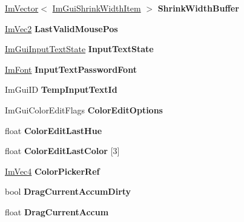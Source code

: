 \begin{DoxyCompactItemize}
\hyperlink{structImVector}{Im\+Vector}$<$ \hyperlink{structImGuiShrinkWidthItem}{Im\+Gui\+Shrink\+Width\+Item} $>$ {\bfseries Shrink\+Width\+Buffer}
\item 
\mbox{\label{structImGuiContext_a778faec27ce643bc10a984e6da2111f5}} 
\hyperlink{structImVec2}{Im\+Vec2} {\bfseries Last\+Valid\+Mouse\+Pos}
\item 
\mbox{\label{structImGuiContext_ab6f5d3daaa248a26bdbcb098d73640c1}} 
\hyperlink{structImGuiInputTextState}{Im\+Gui\+Input\+Text\+State} {\bfseries Input\+Text\+State}
\item 
\mbox{\label{structImGuiContext_a6aa67b9b778bd741d9866ec34cc8ee8b}} 
\hyperlink{structImFont}{Im\+Font} {\bfseries Input\+Text\+Password\+Font}
\item 
\mbox{\label{structImGuiContext_a4ba758785b7ce422290b16e91d3bc8a3}} 
Im\+Gui\+ID {\bfseries Temp\+Input\+Text\+Id}
\item 
\mbox{\label{structImGuiContext_a122394766b40cdb6cbd8a40fbe6ac680}} 
Im\+Gui\+Color\+Edit\+Flags {\bfseries Color\+Edit\+Options}
\item 
\mbox{\label{structImGuiContext_ade0cf1b5cc1f4f0ff3c9b11d6d7891d3}} 
float {\bfseries Color\+Edit\+Last\+Hue}
\item 
\mbox{\label{structImGuiContext_ab43926c68eda8807a6953dda0c910314}} 
float {\bfseries Color\+Edit\+Last\+Color} \mbox{[}3\mbox{]}
\item 
\mbox{\label{structImGuiContext_ae3a119a9a71b31ede7ccc87447627b68}} 
\hyperlink{structImVec4}{Im\+Vec4} {\bfseries Color\+Picker\+Ref}
\item 
\mbox{\label{structImGuiContext_a2a465bca097a53eba66b613d01765636}} 
bool {\bfseries Drag\+Current\+Accum\+Dirty}
\item 
\mbox{\label{structImGuiContext_a524267e65a0b5c3c96a2b629902b4db2}} 
float {\bfseries Drag\+Current\+Accum}
\item 

\end{DoxyCompactItemize}
